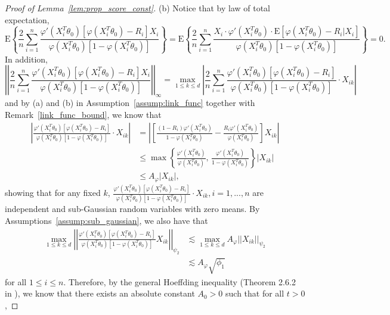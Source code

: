\documentclass[ejsv2,noshowframe]{imsart}
\theoremstyle{plain}
\theoremstyle{definition}
\theoremstyle{remark}
\newcommand{\norm}[1]{\left|\left| #1 \right|\right|}
\begin{document}
\begin{proof}[Proof of Lemma~\ref{lem:prop_score_const}]
	
	\noindent (b) Notice that by law of total expectation,
	$$\mathrm{E}\left\{\frac{2}{n}\sum_{i=1}^n \frac{\varphi'(X_i^T\theta_0)\left[\varphi(X_i^T\theta_0) -R_i \right]X_i}{\varphi(X_i^T\theta_0) \left[1-\varphi(X_i^T\theta_0) \right]}\right\} = \mathrm{E}\left\{\frac{2}{n}\sum_{i=1}^n \frac{X_i \cdot\varphi'(X_i^T\theta_0)\cdot \mathrm{E}\left[\varphi(X_i^T\theta_0) -R_i |X_i\right]}{\varphi(X_i^T\theta_0) \left[1-\varphi(X_i^T\theta_0) \right]}\right\} =0.$$
	In addition, 
	$$\norm{\frac{2}{n}\sum_{i=1}^n \frac{\varphi'(X_i^T\theta_0)\left[\varphi(X_i^T\theta_0) -R_i \right]X_i}{\varphi(X_i^T\theta_0) \left[1-\varphi(X_i^T\theta_0) \right]}}_{\infty} = \max_{1\leq k \leq d} \left|\frac{2}{n}\sum_{i=1}^n \frac{\varphi'(X_i^T\theta_0)\left[\varphi(X_i^T\theta_0) -R_i \right]}{\varphi(X_i^T\theta_0) \left[1-\varphi(X_i^T\theta_0) \right]} \cdot X_{ik} \right|$$
	and by (a) and (b) in Assumption~\ref{assump:link_func} together with Remark~\ref{link_func_bound}, we know that
	\begin{align*}
		\left|\frac{\varphi'(X_i^T\theta_0)\left[\varphi(X_i^T\theta_0) -R_i \right]}{\varphi(X_i^T\theta_0) \left[1-\varphi(X_i^T\theta_0) \right]} \cdot X_{ik}\right| &= \left|\left[\frac{(1-R_i) \varphi'(X_i^T\theta_0)}{1-\varphi(X_i^T\theta_0)} - \frac{R_i \varphi'(X_i^T\theta_0)}{\varphi(X_i^T\theta_0)}\right]X_{ik}\right|\\
		&\leq \max\left\{\frac{\varphi'(X_i^T\theta_0)}{\varphi(X_i^T\theta_0)},\, \frac{\varphi'(X_i^T\theta_0)}{1-\varphi(X_i^T\theta_0)} \right\}|X_{ik}|\\
		&\leq A_{\varphi}|X_{ik}|,
	\end{align*}
	showing that for any fixed $k$, $\frac{\varphi'(X_i^T\theta_0)\left[\varphi(X_i^T\theta_0) -R_i \right]}{\varphi(X_i^T\theta_0) \left[1-\varphi(X_i^T\theta_0) \right]} \cdot X_{ik}, i=1,...,n$ are independent and sub-Gaussian random variables with zero means. By Assumptions~\ref{assump:sub_gaussian}, we also have that
	\begin{align*}
		\max_{1\leq k \leq d} \norm{\frac{\varphi'(X_i^T\theta_0)\left[\varphi(X_i^T\theta_0) -R_i \right]}{\varphi(X_i^T\theta_0) \left[1-\varphi(X_i^T\theta_0) \right]} X_{ik}}_{\psi_2} &\lesssim \max_{1\leq k \leq d} A_{\varphi} \norm{X_{ik}}_{\psi_2}\\
		&\lesssim A_{\varphi} \sqrt{\phi_1}
	\end{align*}
	for all $1\leq i \leq n$. Therefore, by the general Hoeffding inequality (Theorem 2.6.2 in \citealt{vershynin2018high}), we know that there exists an absolute constant $A_0>0$ such that for all $t>0$,

\end{proof}
\end{document}
